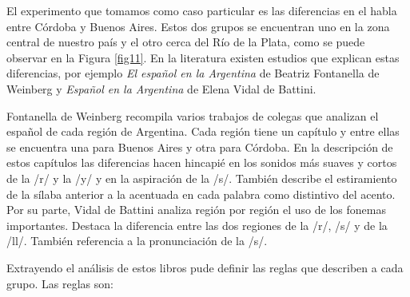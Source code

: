 El experimento que tomamos como caso particular es las diferencias en el habla entre Córdoba y Buenos Aires. Estos dos grupos se encuentran uno en la zona central de nuestro país y el otro cerca del Río de la Plata, como se puede observar en la Figura \ref{fig11}. En la literatura existen estudios que explican estas diferencias, por ejemplo \textit{El español en la Argentina} \cite{Fontanella2000} de Beatriz Fontanella de Weinberg   y \textit{Español en la Argentina} \cite{Vidal1964} de Elena Vidal de Battini. 

Fontanella de Weinberg recompila varios trabajos de colegas que analizan el español de cada región de Argentina. Cada región tiene un capítulo y entre ellas se encuentra una para Buenos Aires y otra para Córdoba. En la descripción de estos capítulos las diferencias hacen hincapié en los sonidos más suaves y cortos de la /r/ y la /y/ y en la aspiración de la /s/. También describe el estiramiento de la sílaba anterior a la acentuada en cada palabra como distintivo del acento. Por su parte, Vidal de Battini analiza región por región el uso de los fonemas importantes. Destaca la diferencia entre las dos regiones de la /r/, /s/ y de la /ll/. También referencia a la pronunciación de la /s/.

Extrayendo el análisis de estos libros pude definir las reglas que describen a cada grupo. Las reglas son: 

